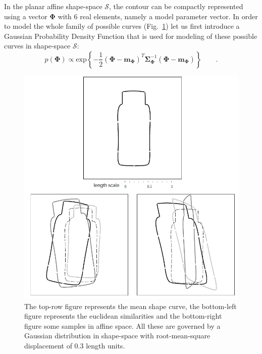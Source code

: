 \documentclass[conference]{IEEEtran}
\begin{document}
In the planar affine shape-space $\mathcal{S}$, the contour can be compactly 
represented using a vector $\mathbf{\Phi}$ with 6 real elements, namely a model
parameter vector. In order to model the whole family of
possible curves (Fig.~\ref{fig:transform}) let us first
introduce a Gaussian Probability Density Function that is used for modeling 
of these possible curves in shape-space $\mathcal{S}$:
\begin{equation}
  \label{eq:prior}
   p(\mathbf{\Phi}) \propto
\mathrm{exp} \left\{ -\frac{1}{2} (\mathbf{\Phi} -
  \mathbf{m}_{\mathbf{\Phi}})^T \mathbf{\Sigma}_{\mathbf{\Phi}}^{-1} (\mathbf{\Phi} -
  \mathbf{m}_{\mathbf{\Phi}}) \right\}\qquad.
\end{equation}
\begin{figure}[htb]
  \centering
  \includegraphics[width=\columnwidth]{prior.jpg}
\caption{The top-row figure represents the mean shape curve, 
  the bottom-left figure represents the euclidean
  similarities and the bottom-right figure
  some samples in affine space. All these are governed by a
  Gaussian distribution in shape-space with root-mean-square
  displacement of 0.3 length units.}
\label{fig:transform}
\end{figure}
\end{document}
